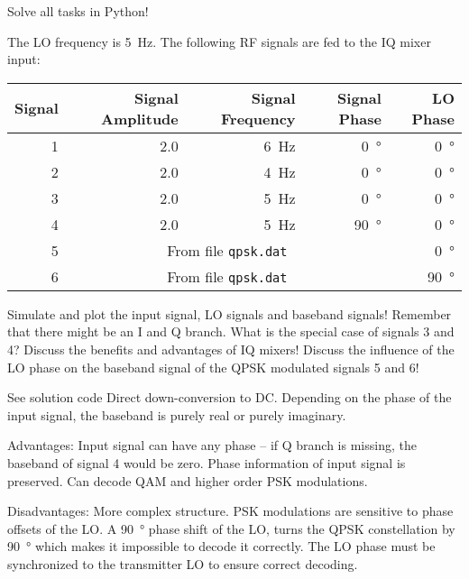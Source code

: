 \begin{question}[subtitle={Python Programming: IQ Mixer}]
	Solve all tasks in Python!
	
	The LO frequency is \SI{5}{Hz}. The following RF signals are fed to the IQ mixer input:
	\begin{tabular}{|r|r|r|r|r}
		\hline
		Signal & Signal Amplitude & Signal Frequency & Signal Phase & LO Phase \\
		\hline
		\hline
		1 & 2.0 & \SI{6}{Hz} & \SI{0}{\degree} & \SI{0}{\degree} \\
		\hline
		2 & 2.0 & \SI{4}{Hz} & \SI{0}{\degree} & \SI{0}{\degree} \\
		\hline
		3 & 2.0 & \SI{5}{Hz} & \SI{0}{\degree} & \SI{0}{\degree} \\
		\hline
		4 & 2.0 & \SI{5}{Hz} & \SI{90}{\degree} & \SI{0}{\degree} \\
		\hline
		5 & \multicolumn{3}{c}{From file \texttt{qpsk.dat}} & \SI{0}{\degree} \\
		\hline
		6 & \multicolumn{3}{c}{From file \texttt{qpsk.dat}} & \SI{90}{\degree} \\
		\hline
	\end{tabular}

	\begin{tasks}
		\task
		Simulate and plot the input signal, LO signals and baseband signals! Remember that there might be an I and Q branch.
		\task
		What is the special case of signals 3 and 4? Discuss the benefits and advantages of IQ mixers!
		\task
		Discuss the influence of the LO phase on the baseband signal of the QPSK modulated signals 5 and 6!
	\end{tasks}
\end{question}

\begin{solution}
	\begin{tasks}
		\task
		See solution code
		\task
		Direct down-conversion to DC. Depending on the phase of the input signal, the baseband is purely real or purely imaginary.
		
		Advantages: Input signal can have any phase -- if Q branch is missing, the baseband of signal 4 would be zero. Phase information of input signal is preserved. Can decode QAM and higher order PSK modulations.
		
		Disadvantages: More complex structure.
		\task
		PSK modulations are sensitive to phase offsets of the LO. A \SI{90}{\degree} phase shift of the LO, turns the QPSK constellation by \SI{90}{\degree} which makes it impossible to decode it correctly. The LO phase must be synchronized to the transmitter LO to ensure correct decoding.
	\end{tasks}
\end{solution}


